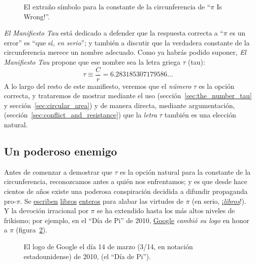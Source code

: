 \begin{figure}
\caption{El extraño símbolo para la constante de la circunferencia de ``$\pi$ Is Wrong!''.\label{fig:palais_tau}}
\end{figure}

\emph{El Manifiesto Tau} está dedicado a defender que la respuesta correcta a ``$\pi$ es un error'' es ``que sí, \emph{en serio}''; y también a discutir que la verdadera constante de la circunferencia merece un nombre adecuado. Como ya habrás podido suponer, \emph{El Manifiesto Tau} propone que ese nombre sea la letra griega $\tau$ (tau):
\begin{equation}
\label{eq:tau}
\tau \equiv \frac{C}{r} = 6.283185307179586\ldots
\end{equation}
A lo largo del resto de este manifiesto, veremos que el \emph{número} $\tau$ es la opción correcta, y trataremos de mostrar mediante el uso (sección~\ref{sec:the_number_tau} y sección~\ref{sec:circular_area}) y de manera directa, mediante argumentación, (sección~\ref{sec:conflict_and_resistance}) que la  \emph{letra} $\tau$ también es una elección natural.

\subsection{Un poderoso enemigo} %
 \label{sec:a_powerful_enemy}

Antes de comenzar a demostrar que $\tau$ es la opción natural para la constante de la circunferencia, reconozcamos antes a quién nos enfrentamos; y es que desde hace cientos de años existe una poderosa conspiración decidida a difundir propaganda pro-$\pi$. Se  \href{http://www.amazon.com/exec/obidos/ISBN=0802713327/parallaxproductiA/}{escriben} \href{http://www.amazon.com/Pi-Sky-Counting-Thinking-Being/dp/0198539568}{libros} \href{http://www.amazon.com/exec/obidos/ISBN=0312381859/parallaxproductiA/}{enteros} para alabar las virtudes de $\pi$ (en serio, ¡\href{http://www.amazon.com/exec/obidos/ISBN=0387989463/parallaxproductiA/}{\emph{libros}}!). Y la devoción irracional por  $\pi$ se ha extendido hasta los más altos niveles de frikismo; por ejemplo, en el ``Día de Pi'' de 2010, \href{http://www.google.com/}{Google} \emph{cambió su logo} en honor a $\pi$ (figura~\ref{fig:google_pi_day.}).

\begin{figure}
\begin{center}
\end{center}
\caption{El logo de Google el día 14 de marzo (3/14, en notación estadounidense)
de 2010, (el ``Día de Pi'').\label{fig:google_pi_day.}}
\end{figure}

